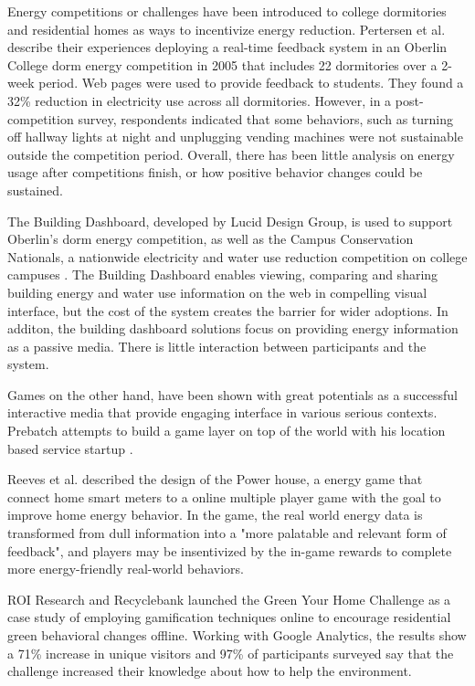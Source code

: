 \documentclass{acm_proc_article-sp}
\begin{document}
Energy competitions or challenges have been introduced to college dormitories 
and residential homes as ways to incentivize energy reduction. Pertersen et 
al. describe their experiences deploying a real-time feedback system in an 
Oberlin College dorm energy competition in 2005 that includes 22 dormitories 
over a 2-week period\cite{petersen-dorm-energy-reduction}. Web pages were used 
to provide feedback to students. They found a 32\% reduction in electricity 
use across all dormitories. However, in a post-competition survey, respondents 
indicated that some behaviors, such as turning off hallway lights at night 
and unplugging vending machines were not sustainable outside the competition 
period.  Overall, there has been little analysis on energy usage after 
competitions finish, or how positive behavior changes could be sustained.

The Building Dashboard\cite{building-dashboard}, developed by Lucid Design 
Group, is used to support Oberlin's dorm energy competition,
as well as the Campus Conservation Nationals, a nationwide electricity and 
water use reduction competition on college campuses \cite{competetoreduce}. 
The Building Dashboard enables viewing, comparing and sharing building energy
and water use information on the web in compelling visual interface, but the 
cost of the system creates the barrier for wider adoptions. In additon, the 
building dashboard solutions focus on providing energy information as 
a passive media. There is little interaction between participants and the system.

Games on the other hand, have been shown with great potentials as a successful
interactive media that provide engaging interface in various serious 
contexts\cite{mcgonigal2011reality,reeves2009total}. Prebatch attempts to build
a game layer on top of the world with his location based service startup
\cite{Priebatsch2010ted}. 

Reeves et al. described the design of the Power house, 
a energy game that connect home smart meters to a online multiple player game 
with the goal to improve home energy behavior\cite{Reeves2011powerhouse}. 
In the game, the real world energy data is transformed from dull 
information into a "more palatable and relevant form of feedback", and players 
may be insentivized by the in-game rewards to complete more energy-friendly 
real-world behaviors. 

ROI Research and Recyclebank launched the Green Your Home Challenge as a case 
study of employing gamification\cite{Deterding2011mt} techniques online to 
encourage residential green behavioral changes offline\cite{gamingforgood}. 
Working with Google Analytics, the results show a 71\% increase in unique 
visitors and 97\% of participants surveyed say that the challenge increased 
their knowledge about how to help the environment. 
\end{document}
